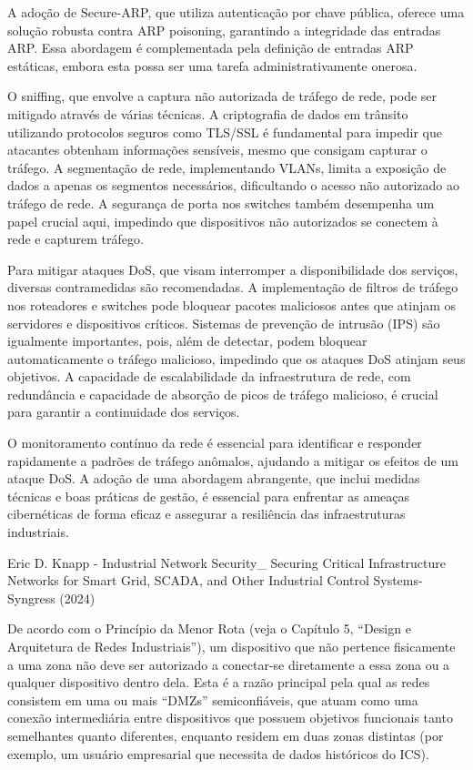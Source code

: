 A adoção de Secure-ARP, que utiliza autenticação por chave pública, oferece uma solução robusta contra ARP poisoning, garantindo a integridade das entradas ARP. Essa abordagem é complementada pela definição de entradas ARP estáticas, embora esta possa ser uma tarefa administrativamente onerosa.

O sniffing, que envolve a captura não autorizada de tráfego de rede, pode ser mitigado através de várias técnicas. A criptografia de dados em trânsito utilizando protocolos seguros como TLS/SSL é fundamental para impedir que atacantes obtenham informações sensíveis, mesmo que consigam capturar o tráfego. A segmentação de rede, implementando VLANs, limita a exposição de dados a apenas os segmentos necessários, dificultando o acesso não autorizado ao tráfego de rede. A segurança de porta nos switches também desempenha um papel crucial aqui, impedindo que dispositivos não autorizados se conectem à rede e capturem tráfego.

Para mitigar ataques DoS, que visam interromper a disponibilidade dos serviços, diversas contramedidas são recomendadas. A implementação de filtros de tráfego nos roteadores e switches pode bloquear pacotes maliciosos antes que atinjam os servidores e dispositivos críticos. Sistemas de prevenção de intrusão (IPS) são igualmente importantes, pois, além de detectar, podem bloquear automaticamente o tráfego malicioso, impedindo que os ataques DoS atinjam seus objetivos. A capacidade de escalabilidade da infraestrutura de rede, com redundância e capacidade de absorção de picos de tráfego malicioso, é crucial para garantir a continuidade dos serviços.

O monitoramento contínuo da rede é essencial para identificar e responder rapidamente a padrões de tráfego anômalos, ajudando a mitigar os efeitos de um ataque DoS. A adoção de uma abordagem abrangente, que inclui medidas técnicas e boas práticas de gestão, é essencial para enfrentar as ameaças cibernéticas de forma eficaz e assegurar a resiliência das infraestruturas industriais.

Eric D. Knapp - Industrial Network Security_ Securing Critical Infrastructure Networks for Smart Grid, SCADA, and Other Industrial Control Systems-Syngress (2024)

De acordo com o Princípio da Menor Rota (veja o Capítulo 5, “Design e Arquitetura de Redes Industriais”), um dispositivo que não pertence fisicamente a uma zona não deve ser autorizado a conectar-se diretamente a essa zona ou a qualquer dispositivo dentro dela. Esta é a razão principal pela qual as redes consistem em uma ou mais “DMZs” semiconfiáveis, que atuam como uma conexão intermediária entre dispositivos que possuem objetivos funcionais tanto semelhantes quanto diferentes, enquanto residem em duas zonas distintas (por exemplo, um usuário empresarial que necessita de dados históricos do ICS).


